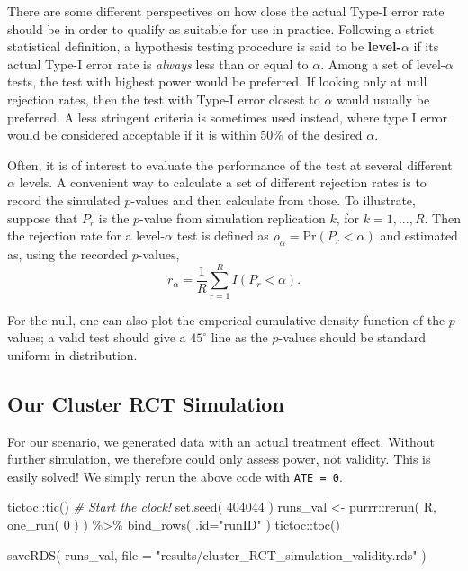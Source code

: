 \documentclass[
]{book}
\newenvironment{Shaded}{\begin{snugshade}}{\end{snugshade}}
\newcommand{\AttributeTok}[1]{\textcolor[rgb]{0.77,0.63,0.00}{#1}}
\newcommand{\CommentTok}[1]{\textcolor[rgb]{0.56,0.35,0.01}{\textit{#1}}}
\newcommand{\DecValTok}[1]{\textcolor[rgb]{0.00,0.00,0.81}{#1}}
\newcommand{\FunctionTok}[1]{\textcolor[rgb]{0.00,0.00,0.00}{#1}}
\newcommand{\NormalTok}[1]{#1}
\newcommand{\OtherTok}[1]{\textcolor[rgb]{0.56,0.35,0.01}{#1}}
\newcommand{\SpecialCharTok}[1]{\textcolor[rgb]{0.00,0.00,0.00}{#1}}
\newcommand{\StringTok}[1]{\textcolor[rgb]{0.31,0.60,0.02}{#1}}
\begin{document}
There are some different perspectives on how close the actual Type-I error rate should be in order to qualify as suitable for use in practice. Following a strict statistical definition, a hypothesis testing procedure is said to be \textbf{level-\(\alpha\)} if its actual Type-I error rate is \emph{always} less than or equal to \(\alpha\).
Among a set of level-\(\alpha\) tests, the test with highest power would be preferred.
If looking only at null rejection rates, then the test with Type-I error closest to \(\alpha\) would usually be preferred.
A less stringent criteria is sometimes used instead, where type I error would be considered acceptable if it is within 50\% of the desired \(\alpha\).

Often, it is of interest to evaluate the performance of the test at several different \(\alpha\) levels.
A convenient way to calculate a set of different rejection rates is to record the simulated \(p\)-values and then calculate from those.
To illustrate, suppose that \(P_r\) is the \(p\)-value from simulation replication \(k\), for \(k = 1,...,R\).
Then the rejection rate for a level-\(\alpha\) test is defined as \(\rho_\alpha = \text{Pr}\left(P_r < \alpha\right)\) and estimated as, using the recorded \(p\)-values,
\[r_\alpha = \frac{1}{R} \sum_{r=1}^R I(P_r < \alpha).\]

For the null, one can also plot the emperical cumulative density function of the \(p\)-values; a valid test should give a \(45^\circ\) line as the \(p\)-values should be standard uniform in distribution.

\hypertarget{our-cluster-rct-simulation}{%
\subsection{Our Cluster RCT Simulation}\label{our-cluster-rct-simulation}}

For our scenario, we generated data with an actual treatment effect.
Without further simulation, we therefore could only assess power, not validity.
This is easily solved!
We simply rerun the above code with \texttt{ATE\ =\ 0}.

\begin{Shaded}
\begin{Highlighting}[]
\NormalTok{tictoc}\SpecialCharTok{::}\FunctionTok{tic}\NormalTok{()  }\CommentTok{\# Start the clock!}
\FunctionTok{set.seed}\NormalTok{( }\DecValTok{404044}\NormalTok{ )}
\NormalTok{runs\_val }\OtherTok{\textless{}{-}} 
\NormalTok{  purrr}\SpecialCharTok{::}\FunctionTok{rerun}\NormalTok{( R, }\FunctionTok{one\_run}\NormalTok{( }\DecValTok{0}\NormalTok{ ) ) }\SpecialCharTok{\%\textgreater{}\%}
  \FunctionTok{bind\_rows}\NormalTok{( }\AttributeTok{.id=}\StringTok{"runID"}\NormalTok{ )}
\NormalTok{tictoc}\SpecialCharTok{::}\FunctionTok{toc}\NormalTok{()}

\FunctionTok{saveRDS}\NormalTok{( runs\_val, }\AttributeTok{file =} \StringTok{"results/cluster\_RCT\_simulation\_validity.rds"}\NormalTok{ )}
\end{Highlighting}
\end{Shaded}
\end{document}
